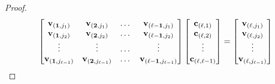 \documentclass{article}
\begin{document}
\begin{proof}
\begin{equation}\label{eq411}
\begin{bmatrix}
\bold{v}_{(\bold{1},j_1)} & \bold{v}_{(\bold{2},j_1)} & \dots & \bold{v}_{(\bold{\ell-1},j_1)}  \\
\bold{v}_{(\bold{1},j_2)} & \bold{v}_{(\bold{2},j_2)} & \dots & \bold{v}_{(\bold{\ell-1},j_2)}\\
\vdots & \vdots & \dots & \vdots \\
\bold{v}_{(\bold{1},j_{\ell-1})} & \bold{v}_{(\bold{2},j_{\ell-1})} & \dots & \bold{v}_{(\bold{\ell-1},j_{\ell-1})}\\
\end{bmatrix}
\begin{bmatrix}
\bold{c}_{(\bold{\ell},1)} \\ \bold{c}_{(\bold{\ell},2)} \\ \vdots \\ \bold{c}_{(\bold{\ell},\ell-1)}
\end{bmatrix}
=
\begin{bmatrix}
\bold{v}_{(\bold{\ell},j_1)} \\ \bold{v}_{(\bold{\ell},j_2)}\\ \vdots \\ \bold{v}_{(\bold{\ell},j_{\ell-1})}
\end{bmatrix}
\end{equation}


\end{proof}
\end{document}
